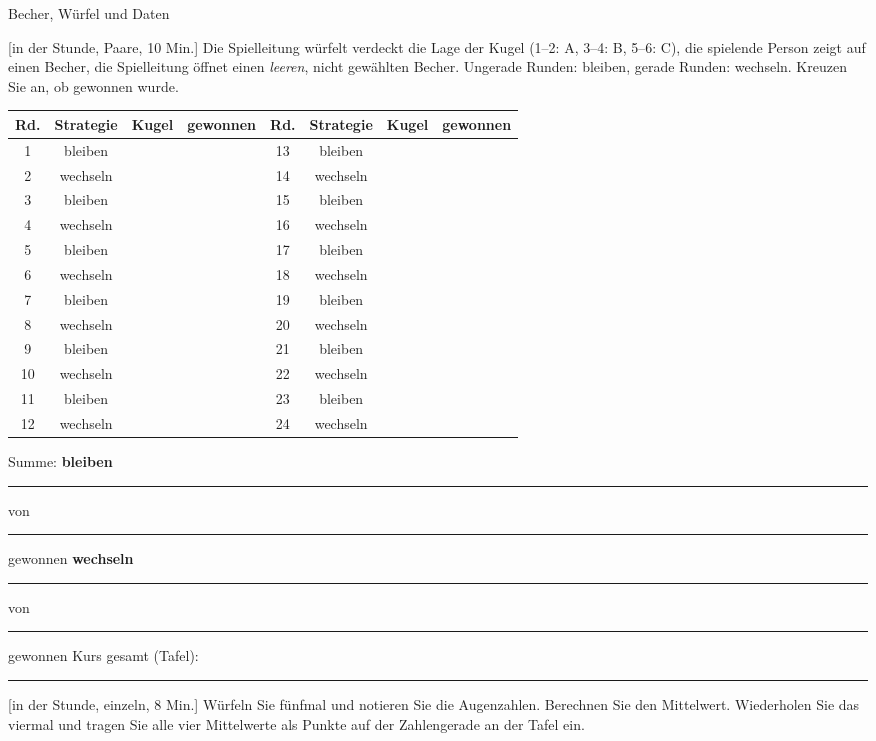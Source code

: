 \begin{uebungsblatt}{Becher, Würfel und Daten}

[in der Stunde, Paare, 10 Min.]
Die Spielleitung würfelt verdeckt die Lage der Kugel (1--2: A, 3--4: B,
5--6: C), die spielende Person zeigt auf einen Becher, die Spielleitung
öffnet einen \emph{leeren}, nicht gewählten Becher. Ungerade Runden:
bleiben, gerade Runden: wechseln. Kreuzen Sie an, ob gewonnen wurde.

\begin{center}
\small
\renewcommand{\arraystretch}{1.25}
\begin{tabular}{|c|c|c|c||c|c|c|c|}
\hline
\textbf{Rd.} & \textbf{Strategie} & \textbf{Kugel} & \textbf{gewonnen} &
\textbf{Rd.} & \textbf{Strategie} & \textbf{Kugel} & \textbf{gewonnen} \\ \hline
1 & bleiben & & & 13 & bleiben & & \\ \hline
2 & wechseln & & & 14 & wechseln & & \\ \hline
3 & bleiben & & & 15 & bleiben & & \\ \hline
4 & wechseln & & & 16 & wechseln & & \\ \hline
5 & bleiben & & & 17 & bleiben & & \\ \hline
6 & wechseln & & & 18 & wechseln & & \\ \hline
7 & bleiben & & & 19 & bleiben & & \\ \hline
8 & wechseln & & & 20 & wechseln & & \\ \hline
9 & bleiben & & & 21 & bleiben & & \\ \hline
10 & wechseln & & & 22 & wechseln & & \\ \hline
11 & bleiben & & & 23 & bleiben & & \\ \hline
12 & wechseln & & & 24 & wechseln & & \\ \hline
\end{tabular}
\end{center}
Summe: \textbf{bleiben} \rule{12mm}{0.3pt} von \rule{12mm}{0.3pt}
gewonnen \qquad \textbf{wechseln} \rule{12mm}{0.3pt} von
\rule{12mm}{0.3pt} gewonnen \qquad Kurs gesamt (Tafel):
\rule{25mm}{0.3pt}

[in der Stunde, einzeln, 8 Min.]
Würfeln Sie fünfmal und notieren Sie die Augenzahlen. Berechnen Sie den
Mittelwert. Wiederholen Sie das viermal und tragen Sie alle vier
Mittelwerte als Punkte auf der Zahlengerade an der Tafel ein.


\end{uebungsblatt}
